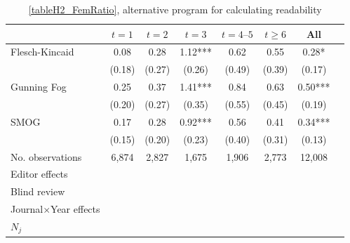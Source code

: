 \begin{table}
    \footnotesize
    \centering
    \begin{threeparttable}
        \caption{\autoref{tableH2_FemRatio}, alternative program for calculating readability}
        \label{tableH2_R}
        \begin{tabular}{p{3cm}S@{}S@{}S@{}S@{}S@{}S@{}S@{}}
            \toprule
            &{\(t=1\)}&{\(t=2\)}&{\(t=3\)}&{\(t=4\text{--}5\)}&{\(t\ge6\)}&{All}\\
            \midrule
            Flesch-Kincaid                &        0.08   &        0.28   &        1.12***&        0.62   &        0.55   &        0.28*  \\
                                          &      (0.18)   &      (0.27)   &      (0.26)   &      (0.49)   &      (0.39)   &      (0.17)   \\
            Gunning Fog                   &        0.25   &        0.37   &        1.41***&        0.84   &        0.63   &        0.50***\\
                                          &      (0.20)   &      (0.27)   &      (0.35)   &      (0.55)   &      (0.45)   &      (0.19)   \\
            SMOG                          &        0.17   &        0.28   &        0.92***&        0.56   &        0.41   &        0.34***\\
                                          &      (0.15)   &      (0.20)   &      (0.23)   &      (0.40)   &      (0.31)   &      (0.13)   \\
            \midrule
            No. observations              &       6,874   &       2,827   &       1,675   &       1,906   &       2,773   &      12,008   \\
            \midrule
Editor effects        &           {}   &           {}   &           {}   &           {}   &           {}   &           {}   \\
            Blind review                  &           {}   &           {}   &           {}   &           {}   &           {}   &           {}   \\
            Journal\(\times\)Year effects          &           {}   &           {}   &           {}   &           {}   &           {}   &           {}   \\
            \(N_j\)                       &           {}   &           {}   &           {}   &           {}   &           {}   &           {}   \\

\end{tabular}
\end{threeparttable}
\end{table}
